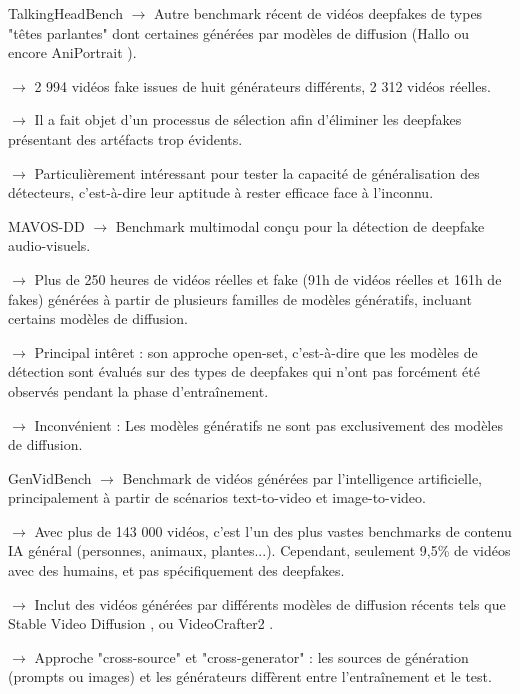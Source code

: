 \documentclass[10pt,aspectratio=169]{beamer}
\begin{document}
\begin{frame}{TalkingHeadBench \citep{xiong}}
    $\to$ Autre benchmark récent de vidéos deepfakes de types "têtes parlantes" dont certaines générées par modèles de diffusion (Hallo \citep{xu2024} ou encore AniPortrait \citep{wei}).

    \bigskip

    $\to$ 2 994 vidéos fake issues de huit générateurs différents, 2 312 vidéos réelles.

    \bigskip

    $\to$ Il a fait objet d'un processus de sélection afin d'éliminer les deepfakes présentant des artéfacts trop évidents.

    \bigskip

    $\to$ Particulièrement intéressant pour tester la capacité de généralisation des détecteurs, c'est-à-dire leur aptitude à rester efficace face à l'inconnu.
\end{frame}

\begin{frame}{MAVOS-DD \citep{croitoru}}
    $\to$ Benchmark multimodal conçu pour la détection de deepfake audio-visuels.

    \bigskip

    $\to$ Plus de 250 heures de vidéos réelles et fake (91h de vidéos réelles et 161h de fakes) générées à partir de plusieurs familles de modèles génératifs, incluant certains modèles de diffusion.

    \bigskip

    $\to$ Principal intêret : son approche open-set, c'est-à-dire que les modèles de détection sont évalués sur des types de deepfakes qui n’ont pas forcément été observés pendant la phase d'entraînement.

    \bigskip

    $\to$ Inconvénient : Les modèles génératifs ne sont pas exclusivement des modèles de diffusion. 
\end{frame}

\begin{frame}{GenVidBench \citep{ni}}
    $\to$ Benchmark de vidéos générées par l'intelligence artificielle, principalement à partir de scénarios text-to-video et image-to-video.

    \bigskip

    $\to$ Avec plus de 143 000 vidéos, c'est l'un des plus vastes benchmarks de contenu IA général (personnes, animaux, plantes...). Cependant, seulement 9,5\% de vidéos avec des humains, et pas spécifiquement des deepfakes.

    \bigskip

    $\to$ Inclut des vidéos générées par différents modèles de diffusion récents tels que Stable Video Diffusion \citep{blattmann}, ou VideoCrafter2 \citep{chen2}.

    \bigskip

    $\to$ Approche "cross-source" et "cross-generator" : les sources de génération (prompts ou images) et les générateurs diffèrent entre l'entraînement et le test.
\end{frame}
\end{document}

